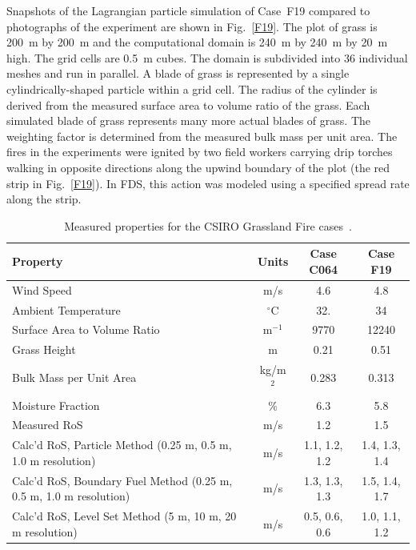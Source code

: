 \documentclass[journal,article,atmosphere,submit,moreauthors,pdftex]{Definitions_Review_Process/mdpi}
\begin{document}
Snapshots of the Lagrangian particle simulation of Case~F19 compared to photographs of the experiment are shown in Fig.~\ref{F19}. The plot of grass is 200~m by 200~m and the computational domain is 240~m by 240~m by 20~m high. The grid cells are 0.5~m cubes. The domain is subdivided into 36 individual meshes and run in parallel. A blade of grass is represented by a single cylindrically-shaped particle within a grid cell. The radius of the cylinder is derived from the measured surface area to volume ratio of the grass. Each simulated blade of grass represents many more actual blades of grass. The weighting factor is determined from the measured bulk mass per unit area. The fires in the experiments were ignited by two field workers carrying drip torches walking in opposite directions along the upwind boundary of the plot (the red strip in Fig.~\ref{F19}). In FDS, this action was modeled using a specified spread rate along the strip.

\begin{table}[ht]
\begin{center}
\caption[Measured properties for the CSIRO Grassland Fire cases]{Measured properties for the CSIRO Grassland Fire cases~\cite{Cheney:IJWF1993}.}
\label{Properties_Grasses}
\begin{tabular}{|l|c|c|c|}
\hline
Property                        & Units        & Case C064 & Case F19    \\ \hline \hline
Wind Speed                      & m/s          & 4.6       & 4.8         \\ \hline
Ambient Temperature             & $^\circ$C    & 32.       & 34          \\ \hline
Surface Area to Volume Ratio    & m$^{-1}$     & 9770      & 12240       \\ \hline
Grass Height                    & m            & 0.21      & 0.51        \\ \hline
Bulk Mass per Unit Area         & kg/m$^2$     & 0.283     & 0.313       \\ \hline
Moisture Fraction               & \%           & 6.3       & 5.8         \\ \hline
Measured RoS                    & m/s          & 1.2       & 1.5         \\ \hline
Calc'd RoS, Particle Method (0.25 m, 0.5 m, 1.0 m resolution) 
                                & m/s          & 1.1, 1.2, 1.2   & 1.4, 1.3, 1.4          \\ \hline
Calc'd RoS, Boundary Fuel Method (0.25 m, 0.5 m, 1.0 m resolution) 
                                & m/s          & 1.3, 1.3, 1.3   & 1.5, 1.4, 1.7          \\ \hline
Calc'd RoS, Level Set Method (5 m, 10 m, 20 m resolution) 
                                & m/s          & 0.5, 0.6, 0.6   & 1.0, 1.1, 1.2          \\ \hline
\end{tabular}
\end{center}
\end{table}
\end{document}
